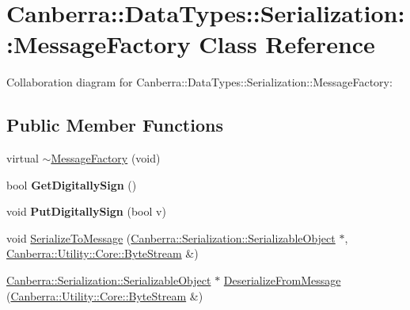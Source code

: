 \hypertarget{class_canberra_1_1_data_types_1_1_serialization_1_1_message_factory}{}\section{Canberra\+:\+:Data\+Types\+:\+:Serialization\+:\+:Message\+Factory Class Reference}
\label{class_canberra_1_1_data_types_1_1_serialization_1_1_message_factory}


Collaboration diagram for Canberra\+:\+:Data\+Types\+:\+:Serialization\+:\+:Message\+Factory\+:
\subsection*{Public Member Functions}
\begin{DoxyCompactItemize}
\item 
virtual \hyperlink{class_canberra_1_1_data_types_1_1_serialization_1_1_message_factory_a5def241bfd7f4c6138bca7b883420494_a5def241bfd7f4c6138bca7b883420494}{$\sim$\+Message\+Factory} (void)
\item 
\mbox{\label{class_canberra_1_1_data_types_1_1_serialization_1_1_message_factory_ab704cb86e488b8e441a7cd934d89cc6d}} 
bool {\bfseries Get\+Digitally\+Sign} ()
\item 
\mbox{\label{class_canberra_1_1_data_types_1_1_serialization_1_1_message_factory_a81d983d99c6d4160e49a3c8115b99241}} 
void {\bfseries Put\+Digitally\+Sign} (bool v)
\item 
void \hyperlink{class_canberra_1_1_data_types_1_1_serialization_1_1_message_factory_a04dda305fdbf7bb5345967f0529e6387_a04dda305fdbf7bb5345967f0529e6387}{Serialize\+To\+Message} (\hyperlink{class_canberra_1_1_serialization_1_1_serializable_object}{Canberra\+::\+Serialization\+::\+Serializable\+Object} $\ast$, \hyperlink{class_canberra_1_1_utility_1_1_core_1_1_byte_stream}{Canberra\+::\+Utility\+::\+Core\+::\+Byte\+Stream} \&)
\item 
\hyperlink{class_canberra_1_1_serialization_1_1_serializable_object}{Canberra\+::\+Serialization\+::\+Serializable\+Object} $\ast$ \hyperlink{class_canberra_1_1_data_types_1_1_serialization_1_1_message_factory_a58d4f6449fcb585e027ab6aad1b4e799_a58d4f6449fcb585e027ab6aad1b4e799}{Deserialize\+From\+Message} (\hyperlink{class_canberra_1_1_utility_1_1_core_1_1_byte_stream}{Canberra\+::\+Utility\+::\+Core\+::\+Byte\+Stream} \&)
\end{DoxyCompactItemize}
